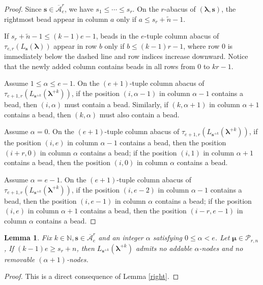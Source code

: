 \documentclass[a4paper,10pt]{amsart}
\theoremstyle{plain}
\def\bs{{\boldsymbol{s}}}
\def\N{{\mathbb N}}
\def\PP{\mathscr{P}}
\def\blam{{\boldsymbol \lambda}}
\def\bmu{{\boldsymbol \mu}}
\theoremstyle{plain}
\newtheorem{lemma}[theorem]{Lemma}
\numberwithin{equation}{section}
\begin{document}
\begin{proof}
 Since \(\boldsymbol{s} \in \overline{\mathcal A}^r_e\), we have \(s_1 \le \cdots \le s_r\). On the $r$-abacus of \((\blam,\boldsymbol{s})\), the rightmost bead appear in column $a$ only if \(a\leq s_r +\tilde n - 1\).

If $s_r+ \tilde n-1\le (k-1)e-1$, beads in the $e$-tuple column abacus of $\tau_{e,r}(L_{\boldsymbol{s}}(\boldsymbol{\lambda}))$ appear in row $b$ only if $b\leq (k-1)r-1$, where row $0$ is immediately below the dashed line and row indices increase downward. Notice that the newly added column contains beads in all rows from $0$ to $kr-1$.

Assume $1\leq\alpha\leq e-1$. On the $(e+1)$-tuple column abacus of $\tau_{e+1,r}(L_{\boldsymbol{s}^{+k}}(\boldsymbol{\lambda}^{+k}))$, if the position $(i,\alpha-1)$ in column $\alpha-1$ contains a bead, then $(i,\alpha)$ must contain a bead. Similarly, if $(k,\alpha+1)$ in column $\alpha+1$ contains a bead, then $(k,\alpha)$ must also contain a bead.

Assume $\alpha=0$. On the $(e+1)$-tuple column abacus of $\tau_{e+1,r}(L_{\boldsymbol{s}^{+k}}(\boldsymbol{\lambda}^{+k}))$, if the position $(i,e)$ in column $\alpha-1$ contains a bead, then the position $(i+r, 0)$ in column $\alpha$ contains a bead; if the position $(i, 1)$ in column $\alpha+1$ contains a bead, then the position $(i, 0)$ in column $\alpha$ contains a bead.

Assume $\alpha=e-1$. On the $(e+1)$-tuple column abacus of $\tau_{e+1,r}(L_{\boldsymbol{s}^{+k}}(\boldsymbol{\lambda}^{+k}))$, if the position $(i,e-2)$ in column $\alpha-1$ contains a bead, then the position $(i,e-1)$ in column $\alpha$ contains a bead; if the position $(i,e)$ in column $\alpha+1$ contains a bead, then the position $(i-r, e-1)$ in column $\alpha$ contains a bead.
\end{proof}



\begin{lemma}\label{no+k}
Fix $k\in\N, \bs\in \overline{\mathcal A}^r_e$ and an integer \(\alpha\) satisfying \(0\le \alpha<e\). Let $\bmu\in\PP_{r,n}$, If \((k-1)e \ge s_r +n\), then \(L_{\boldsymbol{s}^{+k}}(\boldsymbol{\lambda}^{+k})\) admits no addable \(\alpha\)-nodes and no removable \((\alpha+1)\)-nodes.
\end{lemma}

\begin{proof}
This is a direct consequence of Lemma \ref{right}.
\end{proof}
\end{document}
